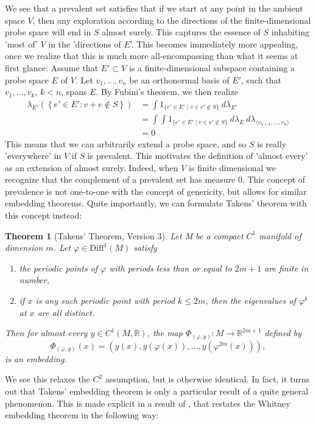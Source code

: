 \documentclass[11pt, a4paper]{memoir}
\theoremstyle{break}
\newtheorem{thm}{Theorem}
\theoremstyle{break}
\theoremstyle{nonumberplain}
\newcommand{\mR}{\mathbb{R}}
\begin{document}
We see that a prevalent set satisfies that if we start at any point in the ambient space $V$, then any exploration according to the directions of the finite-dimensional probe space will end in $S$ almost surely. This captures the essence of $S$ inhabiting 'most of' $V$ in the 'directions of $E$'. This becomes immediately more appealing, once we realize that this is much more all-encompassing than what it seems at first glance: Assume that $E'\subset V$ is a finite-dimensional subspace containing a probe space $E$ of $V$. Let $v_1,\ldots,v_n$ be an orthonormal basis of $E'$, such that $v_1,\ldots,v_k$, $k<n$, spans $E$. By Fubini's theorem, we then realize
\begin{align*}
\lambda_{E'}\left(\left\{e'\in E':v+e\not\in S\right\}\right)&=\int 1_{\{e'\in E'\mid v\in e'\notin S\}}\ d\lambda_{E'}\\
&=\int\int 1_{\{e'\in E'\mid  v\in e'\notin S\}}\ d\lambda_{E}\ d\lambda_{\langle v_{k+1},\ldots, v_n \rangle}\\
&=0
\end{align*}
This means that we can arbitrarily extend a probe space, and so $S$ is really 'everywhere' in $V$ if $S$ is prevalent. This motivates the definition of 'almost every' as an extension of almost surely. Indeed, when $V$ is finite dimensional we recognize that the complement of a prevalent set has measure 0. This concept of prevalence is not one-to-one with the concept of genericity, but allows for similar embedding theorems. Quite importantly, we can formulate Takens' theorem with this concept instead:
\begin{thm}[Takens' Theorem, Version 3]
Let M be a compact $C^1$ manifold of dimension $m$. Let $\varphi\in\text{Diff}^1(M)$ satisfy
\begin{enumerate}[label=\arabic*)]
	\item the periodic points of $\varphi$ with periods less than or equal to $2m+1$ are finite in number,
	\item if $x$ is any such periodic point with period $k\leqslant 2m$, then the eigenvalues of $\varphi^k$ at $x$ are all distinct.
\end{enumerate}
 Then for almost every $y\in C^1(M,\mR)$, the map $\Phi_{(\varphi,y)}:M\to \mathbb{R}^{2m+1}$ defined by
$$\Phi_{(\varphi,y)}(x)=(y(x),y(\varphi(x)),...,y(\varphi^{2m}(x))),$$
is an embedding. \cite{Sauer1991}
\end{thm}
We see this relaxes the $C^2$ assumption, but is otherwise identical. In fact, it turns out that Takens' embedding theorem is only a particular result of a quite general phenomenon. This is made explicit in a result of \cite{Sauer1991}, that restates the Whitney embedding theorem in the following way:
\end{document}
